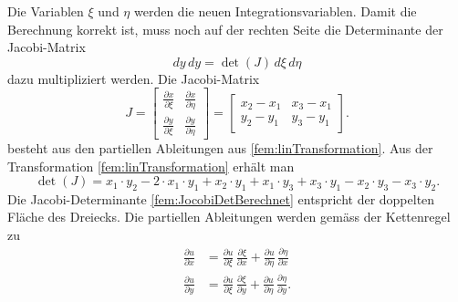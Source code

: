 Die Variablen $\xi$ und $\eta$ werden die neuen Integrationsvariablen.
Damit die Berechnung korrekt ist, muss noch
auf der rechten Seite
die Determinante der Jacobi-Matrix
\begin{equation}
dy \, dy = \det(J) \, d\xi \, d\eta
\label{fem:newTransformation}
\end{equation}
dazu multipliziert werden.
Die Jacobi-Matrix
\begin{equation}
J %
=
\begin{bmatrix}
\displaystyle\frac{\partial x}{\partial \xi}
	&\displaystyle\frac{\partial x}{\partial \eta}
\\
\displaystyle\frac{\partial y}{\partial \xi}
	&\displaystyle\frac{\partial y}{\partial \eta}     
\end{bmatrix}
= 
\begin{bmatrix}
    x_2 - x_1  &  x_3 -x_1      \\
    y_2 - y_1  &  y_3 - y_1      
\end{bmatrix}.
	\label{fem:Jocobi}
\end{equation}
besteht aus den partiellen Ableitungen aus \eqref{fem:linTransformation}.
Aus der Transformation \eqref{fem:linTransformation} erhält man 
\begin{equation}
	\det(J) = x_1 \cdot y_2 - 2 \cdot x_1 \cdot y_1 + x_2 \cdot y_1 + x_1\cdot y_3 + x_3 \cdot y_1 - x_2 \cdot y_3 - x_3 \cdot y_2.
	\label{fem:JocobiDetBerechnet}
\end{equation}
Die Jacobi-Determinante \eqref{fem:JocobiDetBerechnet} entspricht
der doppelten Fläche des Dreiecks.
Die partiellen Ableitungen werden gemäss der Kettenregel zu 
\begin{equation}
\begin{split}
	\frac{\partial u}{\partial x} &= \frac{\partial u}{\partial \xi} \, \frac{\partial \xi}{\partial x} + \frac{\partial u}{\partial \eta} \, \frac{\partial \eta}{\partial x} \\
	\frac{\partial u}{\partial y} &= \frac{\partial u}{\partial \xi} \, \frac{\partial \xi}{\partial y} + \frac{\partial u}{\partial \eta} \, \frac{\partial \eta}{\partial y}.
	\end{split}
\end{equation}
